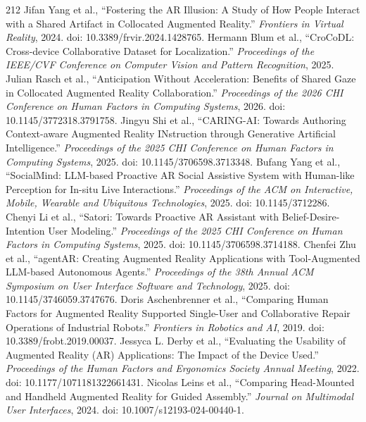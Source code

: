\begin{thebibliography}{212}
 Jifan Yang et al., ``Fostering the {AR} Illusion: A Study of How People Interact with a Shared Artifact in Collocated Augmented Reality.'' \emph{Frontiers in Virtual Reality}, 2024. doi: 10.3389/frvir.2024.1428765.
 Hermann Blum et al., ``{CroCoDL}: Cross-device Collaborative Dataset for Localization.'' \emph{Proceedings of the IEEE/CVF Conference on Computer Vision and Pattern Recognition}, 2025.
 Julian Rasch et al., ``Anticipation Without Acceleration: Benefits of Shared Gaze in Collocated Augmented Reality Collaboration.'' \emph{Proceedings of the 2026 CHI Conference on Human Factors in Computing Systems}, 2026. doi: 10.1145/3772318.3791758.
 Jingyu Shi et al., ``{CARING-AI}: Towards Authoring Context-aware Augmented Reality INstruction through Generative Artificial Intelligence.'' \emph{Proceedings of the 2025 CHI Conference on Human Factors in Computing Systems}, 2025. doi: 10.1145/3706598.3713348.
 Bufang Yang et al., ``{SocialMind}: {LLM}-based Proactive {AR} Social Assistive System with Human-like Perception for In-situ Live Interactions.'' \emph{Proceedings of the ACM on Interactive, Mobile, Wearable and Ubiquitous Technologies}, 2025. doi: 10.1145/3712286.
 Chenyi Li et al., ``Satori: Towards Proactive {AR} Assistant with Belief-Desire-Intention User Modeling.'' \emph{Proceedings of the 2025 CHI Conference on Human Factors in Computing Systems}, 2025. doi: 10.1145/3706598.3714188.
 Chenfei Zhu et al., ``{agentAR}: Creating Augmented Reality Applications with Tool-Augmented {LLM}-based Autonomous Agents.'' \emph{Proceedings of the 38th Annual ACM Symposium on User Interface Software and Technology}, 2025. doi: 10.1145/3746059.3747676.
 Doris Aschenbrenner et al., ``Comparing Human Factors for Augmented Reality Supported Single-User and Collaborative Repair Operations of Industrial Robots.'' \emph{Frontiers in Robotics and AI}, 2019. doi: 10.3389/frobt.2019.00037.
 Jessyca L. Derby et al., ``Evaluating the Usability of Augmented Reality ({AR}) Applications: The Impact of the Device Used.'' \emph{Proceedings of the Human Factors and Ergonomics Society Annual Meeting}, 2022. doi: 10.1177/1071181322661431.
 Nicolas Leins et al., ``Comparing Head-Mounted and Handheld Augmented Reality for Guided Assembly.'' \emph{Journal on Multimodal User Interfaces}, 2024. doi: 10.1007/s12193-024-00440-1.

\end{thebibliography}
